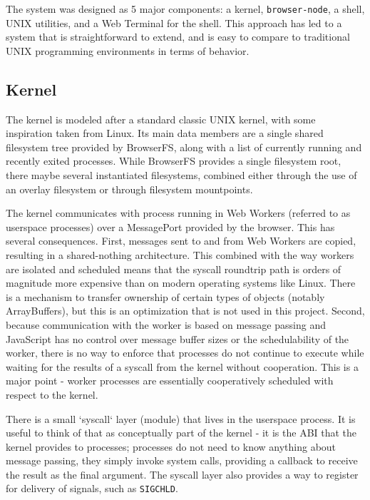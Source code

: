\documentclass{acm_proc_article-sp}
\begin{document}
The system was designed as 5 major components: a kernel,
\texttt{browser-node}, a shell, UNIX utilities, and a Web Terminal for
the shell.  This approach has led to a system that is straightforward
to extend, and is easy to compare to traditional UNIX programming
environments in terms of behavior.

\subsection{Kernel}

The kernel is modeled after a standard classic UNIX kernel, with some
inspiration taken from Linux.  Its main data members are a single
shared filesystem tree provided by BrowserFS, along with a list of
currently running and recently exited processes.  While BrowserFS
provides a single filesystem root, there maybe several instantiated
filesystems, combined either through the use of an overlay filesystem
or through filesystem mountpoints.

The kernel communicates with process running in Web Workers (referred
to as userspace processes) over a MessagePort provided by the browser.
This has several consequences.  First, messages sent to and from Web
Workers are copied, resulting in a shared-nothing architecture.  This
combined with the way workers are isolated and scheduled means that
the syscall roundtrip path is orders of magnitude more expensive than
on modern operating systems like Linux. There is a mechanism to
transfer ownership of certain types of objects (notably ArrayBuffers),
but this is an optimization that is not used in this project.  Second,
because communication with the worker is based on message passing and
JavaScript has no control over message buffer sizes or the
schedulability of the worker, there is no way to enforce that
processes do not continue to execute while waiting for the results of
a syscall from the kernel without cooperation.  This is a major point
- worker processes are essentially cooperatively scheduled with
respect to the kernel.

There is a small `syscall` layer (module) that lives in the userspace
process.  It is useful to think of that as conceptually part of the
kernel - it is the ABI that the kernel provides to processes;
processes do not need to know anything about message passing, they
simply invoke system calls, providing a callback to receive the result
as the final argument.  The syscall layer also provides a way to
register for delivery of signals, such as \texttt{SIGCHLD}.
\end{document}
